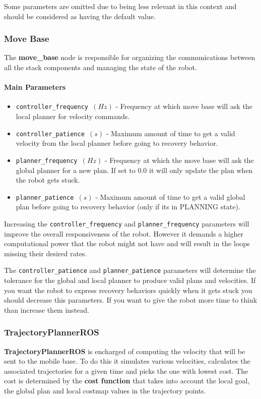 \documentclass[12pt]{article}
\begin{document}
Some parameters are omitted due to being less relevant in this context and should be considered as having the default value.
\subsubsection{Move Base}
The \textbf{move\_base} node is responsible for organizing the communications between all the stack components and managing the state of the robot.
\paragraph{Main Parameters}
\begin{itemize}[label={}]
    \item \texttt{controller\_frequency $(Hz)$} - Frequency at which move base will ask the local planner for velocity commands.
    \item \texttt{controller\_patience $(s)$} - Maximum amount of time to get a valid velocity from the local planner before going to recovery behavior.
    \item \texttt{planner\_frequency $(Hz)$} - Frequency at which the move base will ask the global planner for a new plan. If set to 0.0 it will only update the plan when the robot gets stuck.
    \item \texttt{planner\_patience $(s)$} - Maximum amount of time to get a valid global plan before going to recovery behavior (only if its in PLANNING state).
\end{itemize}

Increasing the \texttt{controller\_frequency} and \texttt{planner\_frequency} parameters will improve the overall responsiveness of the robot. However it demands a higher computational power that the robot might not have and will result in the loops missing their desired rates.

The \texttt{controller\_patience} and \texttt{planner\_patience} parameters will determine the tolerance for the global and local planner to produce valid plans and velocities. If you want the robot to express recovery behaviors quickly when it gets stuck you should decrease this parameters. If you want to give the robot more time to think than increase them instead.

\subsubsection{TrajectoryPlannerROS}

\textbf{TrajectoryPlannerROS} is encharged of computing the velocity that will be sent to the mobile base. To do this it simulates various velocities, calculates the associated trajectories for a given time and picks the one with lowest cost. The cost is determined by the \textbf{cost function} that takes into account the local goal, the global plan and local costmap values in the trajectory points.
\end{document}

